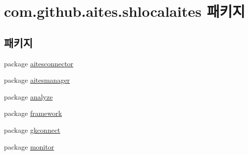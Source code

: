 \hypertarget{namespacecom_1_1github_1_1aites_1_1shlocalaites}{}\section{com.\+github.\+aites.\+shlocalaites 패키지}
\label{namespacecom_1_1github_1_1aites_1_1shlocalaites}
\subsection*{패키지}
\begin{DoxyCompactItemize}
\item 
package \mbox{\hyperlink{namespacecom_1_1github_1_1aites_1_1shlocalaites_1_1aitesconnector}{aitesconnector}}
\item 
package \mbox{\hyperlink{namespacecom_1_1github_1_1aites_1_1shlocalaites_1_1aitesmanager}{aitesmanager}}
\item 
package \mbox{\hyperlink{namespacecom_1_1github_1_1aites_1_1shlocalaites_1_1analyze}{analyze}}
\item 
package \mbox{\hyperlink{namespacecom_1_1github_1_1aites_1_1shlocalaites_1_1framework}{framework}}
\item 
package \mbox{\hyperlink{namespacecom_1_1github_1_1aites_1_1shlocalaites_1_1gkconnect}{gkconnect}}
\item 
package \mbox{\hyperlink{namespacecom_1_1github_1_1aites_1_1shlocalaites_1_1monitor}{monitor}}
\end{DoxyCompactItemize}
